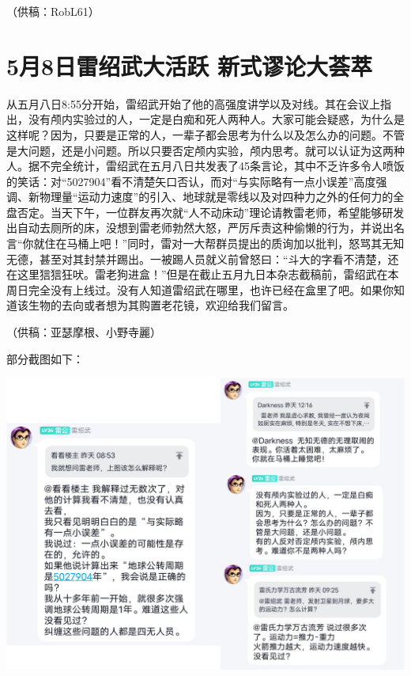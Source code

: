 \documentclass[UTF8,12pt,oneside]{ctexbook}
\begin{document}
        \hfill{（供稿：RobL61）}
        
        \newpage
        
        \section{5月8日雷绍武大活跃 新式谬论大荟萃}
        
        从五月八日8:55分开始，雷绍武开始了他的高强度讲学以及对线。其在会议上指出，没有颅内实验过的人，一定是白痴和死人两种人。大家可能会疑惑，为什么是这样呢？因为，只要是正常的人，一辈子都会思考为什么以及怎么办的问题。不管是大问题，还是小问题。所以只要否定颅内实验，颅内思考。就可以认证为这两种人。据不完全统计，雷绍武在五月八日共发表了45条言论，其中不乏许多令人喷饭的笑话：对“5027904”看不清楚矢口否认，而对“与实际略有一点小误差”高度强调、新物理量“运动力速度”的引入、地球就是零线以及对四种力之外的任何力的全盘否定。当天下午，一位群友再次就“人不动床动”理论请教雷老师，希望能够研发出自动去厕所的床，没想到雷老师勃然大怒，严厉斥责这种偷懒的行为，并说出名言“你就住在马桶上吧！”同时，雷对一大帮群员提出的质询加以批判，怒骂其无知无德，甚至对其封禁并踢出。一被踢人员就义前曾怒曰：“斗大的字看不清楚，还在这里狺狺狂吠。雷老狗进盒！”但是在截止五月九日本杂志截稿前，雷绍武在本周日完全没有上线过。没有人知道雷绍武在哪里，也许已经在盒里了吧。如果你知道该生物的去向或者想为其购置老花镜，欢迎给我们留言。
        
        \hfill{（供稿：亚瑟摩根、小野寺麗）}
        
        \newpage
        
        \noindent
        部分截图如下：

        \begin{center}
            \includegraphics[scale=0.5]{2_fig3.png}
        \end{center}
        
\end{document}
